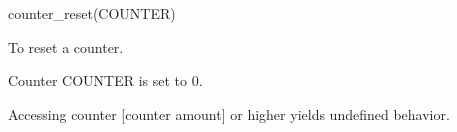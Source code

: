 

\format
counter\_reset(COUNTER)

\purpose

To reset a counter.

\description

Counter COUNTER is set to 0.

\notes

Accessing counter [counter amount] or higher yields undefined behavior.
